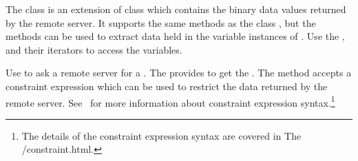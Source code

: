 \documentclass{dods-paper}
\begin{document}
The  class is an extension of class  which 
contains the binary data values returned by the remote server.  It supports
the same methods as the class , but the 
methods can be used to extract data held in the variable instances of
. Use the ,  and their iterators
to access the variables. 

Use  to ask a remote server for a . The
 provides  to get the
. The  method accepts a constraint
expression which can be used to restrict the data returned by the remote
server. See \OPDuser\ for more information about constraint expression
syntax.\footnote{The details of the constraint expression syntax are covered
in The  {\OPDuserUrl/constraint.html}.}



\end{document}
